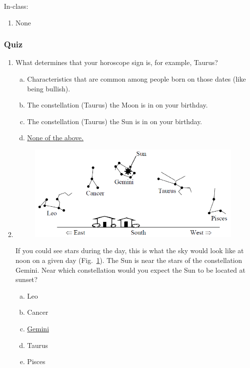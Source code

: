 \documentclass[12pt]{article}
\begin{document}
\noindent
In-class:
\begin{enumerate}
\item None
\end{enumerate}


\subsubsection{Quiz}

\begin{enumerate}
\item
What determines that your horoscope sign is, for example, Taurus?
\begin{enumerate}[a.]
    \item Characteristics that are common among people born on those dates (like being bullish).
    \item The constellation (Taurus) the Moon is in on your birthday.
    \item The constellation (Taurus) the Sun is in on your birthday.
    \item \underline{None of the above.}
\end{enumerate}
\item
\begin{figure}[htbp]
    \centering
    \includegraphics{asq8.png}
    \caption{}
    \label{fig:l7q2}
\end{figure}
If you could see stars during the day, this is what the sky would look like at noon on a given day (Fig.~\ref{fig:l7q2}). The Sun is near the stars of the constellation Gemini. Near which constellation would you expect the Sun to be located at sunset?
\begin{enumerate}[a.]
    \item Leo
    \item Cancer
    \item \underline{Gemini}
    \item Taurus
    \item Pisces

\end{enumerate}
\end{enumerate}
\end{document}
